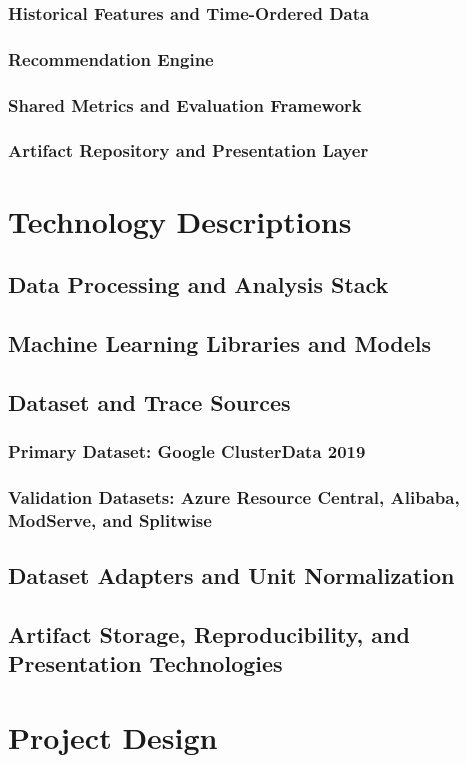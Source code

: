 \documentclass{IEEEtran}
\begin{document}
\subsubsection{Historical Features and Time-Ordered Data}
\subsubsection{Recommendation Engine}
\subsubsection{Shared Metrics and Evaluation Framework}
\subsubsection{Artifact Repository and Presentation Layer}
\section{Technology Descriptions}
\subsection{Data Processing and Analysis Stack}
\subsection{Machine Learning Libraries and Models}
\subsection{Dataset and Trace Sources}
\subsubsection{Primary Dataset: Google ClusterData 2019}
\subsubsection{Validation Datasets: Azure Resource Central, Alibaba, ModServe, and Splitwise}
\subsection{Dataset Adapters and Unit Normalization}
\subsection{Artifact Storage, Reproducibility, and Presentation Technologies}
\section{Project Design}
\end{document}
